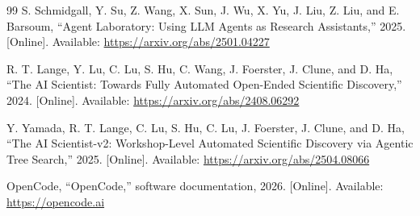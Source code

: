 \documentclass[conference]{IEEEtran}
\begin{document}
\begin{thebibliography}{99}
S. Schmidgall, Y. Su, Z. Wang, X. Sun, J. Wu, X. Yu, J. Liu, Z. Liu, and E. Barsoum, ``Agent Laboratory: Using LLM Agents as Research Assistants,'' 2025. [Online]. Available: \url{https://arxiv.org/abs/2501.04227}

R. T. Lange, Y. Lu, C. Lu, S. Hu, C. Wang, J. Foerster, J. Clune, and D. Ha, ``The AI Scientist: Towards Fully Automated Open-Ended Scientific Discovery,'' 2024. [Online]. Available: \url{https://arxiv.org/abs/2408.06292}

Y. Yamada, R. T. Lange, C. Lu, S. Hu, C. Lu, J. Foerster, J. Clune, and D. Ha, ``The AI Scientist-v2: Workshop-Level Automated Scientific Discovery via Agentic Tree Search,'' 2025. [Online]. Available: \url{https://arxiv.org/abs/2504.08066}

OpenCode, ``OpenCode,'' software documentation, 2026. [Online]. Available: \url{https://opencode.ai}

\end{thebibliography}
\end{document}

